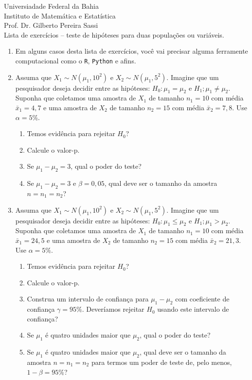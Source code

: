 \documentclass[8pt, a4paper]{article}
\begin{document}
\begin{center}
Universiadade Federal da Bahia\\
Instituto de Matemática e Estatística\\
Prof. Dr. Gilberto Pereira Sassi\\
\vspace{1cm}
Lista de exercícios -- teste de hipóteses para duas populações ou variáveis.
\vspace{1cm}
\end{center}

\begin{enumerate}
	\item[] Em alguns casos desta lista de exercícios, você vai precisar alguma ferramente computacional como o \texttt{R}, \texttt{Python} e afins.
	\item Assuma que $X_1 \sim N(\mu_1, 10^2)$ e $X_2 \sim N(\mu_1, 5^2)$. Imagine que um pesquisador deseja decidir entre as hipóteses: $H_0: \mu_1 = \mu_2$  e $H_1; \mu_1 \neq \mu_2$. Suponha que coletamos uma amostra de $X_1$ de tamanho $n_1=10$ com média $\bar{x}_1=4,7$ e uma amostra de $X_2$ de tamanho $n_2=15$ com média $\bar{x}_2=7,8$. Use $\alpha=5\%$.
	\begin{enumerate}
		\item Temos evidência para rejeitar $H_0$?
		\item Calcule o valor-p. 
		\item Se $\mu_1 - \mu_2 = 3$, qual o poder do teste?
		\item Se $\mu_1 - \mu_2 = 3$ e $\beta = 0,05$, qual deve ser o tamanho da amostra $n=n_1=n_2$?
	\end{enumerate}

	\item Assuma que $X_1 \sim N(\mu_1, 10^2)$ e $X_2 \sim N(\mu_1, 5^2)$. Imagine que um pesquisador deseja decidir entre as hipóteses: $H_0: \mu_1 \leq \mu_2$  e $H_1; \mu_1 > \mu_2$. Suponha que coletamos uma amostra de $X_1$ de tamanho $n_1=10$ com média $\bar{x}_1=24,5$ e uma amostra de $X_2$ de tamanho $n_2=15$ com média $\bar{x}_2=21,3$. Use $\alpha=5\%$.
	\begin{enumerate}
		\item Temos evidência para rejeitar $H_0$?
		\item Calcule o valor-p. 
		\item Construa um intervalo de confiança para $\mu_1 - \mu_2$ com coeficiente de confiança $\gamma=95\%$. Deveríamos rejeitar $H_0$ usando este intervalo de confiança?
		\item Se $\mu_1$ é quatro  unidades maior que $\mu_2$, qual o poder do teste?
		\item Se $\mu_1$ é quatro unidades maior que $\mu_2$, qual deve ser o tamanho da amostra $n=n_1=n_2$ para termos um poder de teste de, pelo menos, $1-\beta = 95\%$?
	\end{enumerate}


\end{enumerate}
\end{document}
